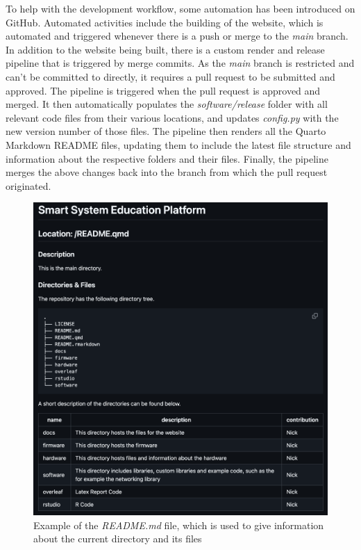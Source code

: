 
To help with the development workflow, some automation has been introduced on GitHub. Automated activities include the building of the website, which is automated and triggered whenever there is a push or merge to the \textit{main} branch. In addition to the website being built, there is a custom render and release pipeline that is triggered by merge commits. As the \textit{main} branch is restricted and can't be committed to directly, it requires a pull request to be submitted and approved. The pipeline is triggered when the pull request is approved and merged. It then automatically populates the \textit{software/release} folder with all relevant code files from their various locations, and updates \textit{config.py} with the new version number of those files. The pipeline then renders all the Quarto Markdown README files, updating them to include the latest file structure and information about the respective folders and their files. Finally, the pipeline merges the above changes back into the branch from which the pull request originated.

\begin{figure}[H]
    \centering
    \includegraphics[width=0.5\linewidth]{overleaf/images/readme.png}
    \vspace{\ftspace}
    \caption{Example of the \textit{README.md} file, which is used to give information about the current directory and its files}
    \label{fig:readme}
\end{figure}

